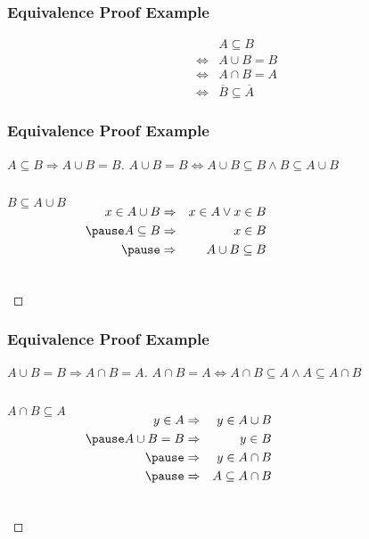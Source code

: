 \documentclass[dvipsnames]{beamer}
\begin{document}
\begin{frame}
  \frametitle{Equivalence Proof Example}

  \begin{theorem}
    \begin{eqnarray*}
      &                 & A \subseteq B\\
      & \Leftrightarrow & A \cup B = B\\
      & \Leftrightarrow & A \cap B = A\\
      & \Leftrightarrow & \overline{B} \subseteq \overline{A}
    \end{eqnarray*}
  \end{theorem}
\end{frame}

\begin{frame}
  \frametitle{Equivalence Proof Example}

  \begin{proof}[$A \subseteq B \Rightarrow A \cup B = B$]
    $A \cup B = B \Leftrightarrow
      A \cup B \subseteq B \wedge B \subseteq A \cup B$

    \pause
    \bigskip
    \begin{columns}
      $B \subseteq A \cup B$

      \pause
      \medskip
      \begin{eqnarray*}
        x \in A \cup B & \Rightarrow & x \in A \vee x \in B\\\pause
        A \subseteq B  & \Rightarrow & x \in B\\\pause
                       & \Rightarrow & A \cup B \subseteq B
      \end{eqnarray*}
    \end{columns}
  \end{proof}
\end{frame}

\begin{frame}
  \frametitle{Equivalence Proof Example}

  \begin{proof}[$A \cup B = B \Rightarrow A \cap B = A$]
    $A \cap B = A \Leftrightarrow
      A \cap B \subseteq A \wedge A \subseteq A \cap B$

    \pause
    \bigskip
    \begin{columns}
      $A \cap B \subseteq A$

      \pause
      \medskip
      \begin{eqnarray*}
        y \in A      & \Rightarrow & y \in A \cup B\\\pause
        A \cup B = B & \Rightarrow & y \in B\\\pause
                     & \Rightarrow & y \in A \cap B\\\pause
                     & \Rightarrow & A \subseteq A \cap B
      \end{eqnarray*}
    \end{columns}
  \end{proof}
\end{frame}
\end{document}
